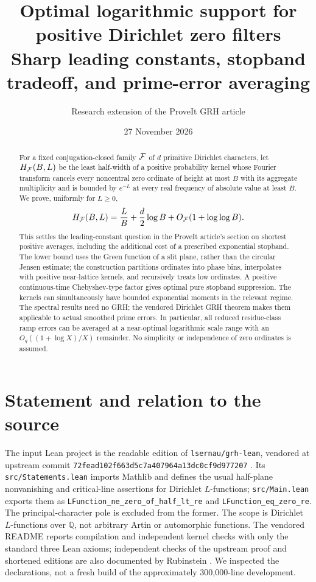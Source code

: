 \documentclass[11pt]{article}
\title{\textbf{Optimal logarithmic support for\\positive Dirichlet zero filters}\\[4pt]\large Sharp leading constants, stopband tradeoff, and prime-error averaging}
\author{Research extension of the ProveIt GRH article}
\date{27 November 2026}
\theoremstyle{definition}\newtheorem{definition}[theorem]{Definition}
\begin{document}
\maketitle
\begin{abstract}
For a fixed conjugation-closed family $\mathcal F$ of $d$ primitive Dirichlet characters, let $H_{\mathcal F}(B,L)$ be the least half-width of a positive probability kernel whose Fourier transform cancels every noncentral zero ordinate of height at most $B$ with its aggregate multiplicity and is bounded by $e^{-L}$ at every real frequency of absolute value at least $B$. We prove, uniformly for $L\ge0$,
\[
 H_{\mathcal F}(B,L)=\frac{L}{B}+\frac d2\log B+O_{\mathcal F}(1+\log\log B).
\]
This settles the leading-constant question in the ProveIt article's section on shortest positive averages, including the additional cost of a prescribed exponential stopband. The lower bound uses the Green function of a slit plane, rather than the circular Jensen estimate; the construction partitions ordinates into phase bins, interpolates with positive near-lattice kernels, and recursively treats low ordinates. A positive continuous-time Chebyshev-type factor gives optimal pure stopband suppression. The kernels can simultaneously have bounded exponential moments in the relevant regime. The spectral results need no GRH; the vendored Dirichlet GRH theorem makes them applicable to actual smoothed prime errors. In particular, all reduced residue-class ramp errors can be averaged at a near-optimal logarithmic scale range with an $O_q((1+\log X)/X)$ remainder. No simplicity or independence of zero ordinates is assumed.
\end{abstract}

\section{Statement and relation to the source}
The input Lean project is the readable edition of \texttt{lsernau/grh-lean}, vendored at upstream commit \texttt{72fead102f663d5c7a407964a13dc0cf9d977207} \cite{lean}. Its \texttt{src/Statements.lean} imports Mathlib and defines the usual half-plane nonvanishing and critical-line assertions for Dirichlet $L$-functions; \texttt{src/Main.lean} exports them as \texttt{LFunction\_ne\_zero\_of\_half\_lt\_re} and \texttt{LFunction\_eq\_zero\_re}. The principal-character pole is excluded from the former. The scope is Dirichlet $L$-functions over $\mathbb Q$, not arbitrary Artin or automorphic functions. The vendored README reports compilation and independent kernel checks with only the standard three Lean axioms; independent checks of the upstream proof and shortened editions are also documented by Rubinstein \cite{verification}. We inspected the declarations, not a fresh build of the approximately 300,000-line development.
\end{document}
